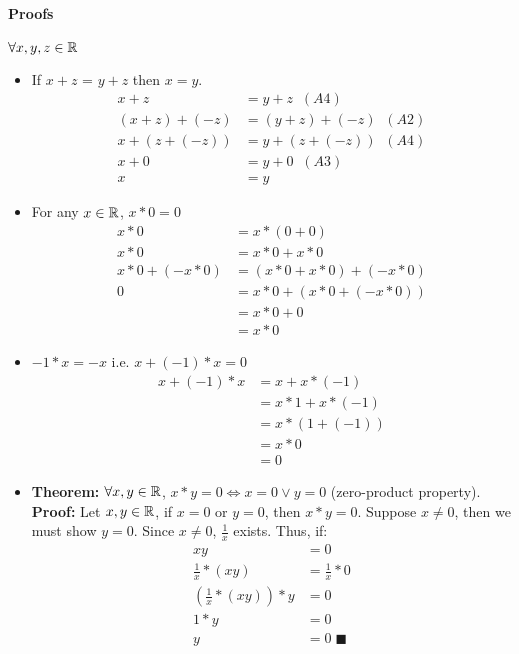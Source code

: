 \paragraph{Proofs} $\forall x, y, z \in \mathbb{R}$
\begin{itemize}
    \item If $x + z$ = $y + z$ then $x = y$.
    \begin{align*}
        x + z &= y + z \;\; (A4) \\
        (x + z) + (-z) &= (y + z) + (-z) \;\; (A2) \\
        x + (z + (-z)) &= y + (z + (-z)) \;\; (A4) \\
        x + 0 &= y + 0 \;\; (A3) \\
        x &= y
    \end{align*}

    \item For any $x \in \mathbb{R}$, $x * 0 = 0$
    \begin{align*}
        x * 0 &= x * (0 + 0) \\
        x * 0 &= x * 0 + x * 0 \\
        x * 0 + (-x * 0) &= (x * 0 + x * 0) + (-x * 0) \\
        0 &= x * 0 + (x * 0 + (-x * 0)) \\
        &= x * 0 + 0 \\
        &= x * 0
    \end{align*}

    \item $-1 * x = -x$ i.e. $x + (-1) * x = 0$
    \begin{align*}
        x + (-1) * x &= x + x * (-1) \\
        &= x * 1 + x * (-1) \\
        &= x * (1 + (-1)) \\
        &= x * 0 \\
        &= 0
    \end{align*}

    \item \textbf{Theorem:} $\forall x, y \in \mathbb{R}$, $x * y = 0 \iff x = 0 \lor y = 0$ (zero-product property). \\
    \textbf{Proof:} Let $x, y \in \mathbb{R}$, if $x = 0$ or $y = 0$, then $x * y = 0$. Suppose $x \neq 0$, then we must show $y = 0$. Since $x \neq 0$, $\frac{1}{x}$ exists. Thus, if:
    \begin{align*}
        xy &= 0 \\
        \frac{1}{x} * (xy) &= \frac{1}{x} * 0 \\
        (\frac{1}{x} * (xy)) * y &= 0 \\
        1 * y &= 0 \\
        y &= 0 \; \blacksquare
    \end{align*}
\end{itemize}


